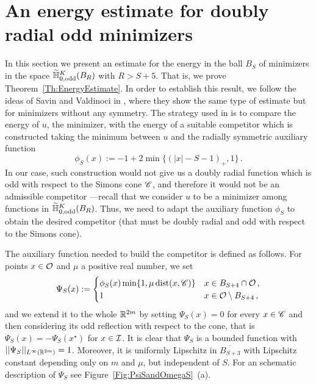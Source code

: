 \section{An energy estimate for doubly radial odd minimizers}
\label{Sec:EnergyEstimate}

In this section we present an estimate for the energy in the ball $B_S$ of minimizers in the space $\widetilde{\mathbb{H}}^K_{0, \mathrm{odd}}(B_R)$ with $R > S+ 5$. That is, we prove Theorem~\ref{Th:EnergyEstimate}. In order to establish this result, we follow the ideas of Savin and Valdinoci in \cite{SavinValdinoci-EnergyEstimate}, where they show the same type of estimate but for minimizers without any symmetry. The strategy used in \cite{SavinValdinoci-EnergyEstimate} is to compare the energy of $u$, the minimizer, with the energy of a suitable competitor which is constructed taking the minimum between $u$ and the radially symmetric auxiliary function
\begin{equation}
	\label{Eq:DefPhiS}
	\phi_S (x) :=-1+2\min\{(|x|-S-1)_+,1\}\,.
\end{equation}
In our case, such construction would not give us a doubly radial function which is odd with respect to the Simons cone $\mathscr{C}$, and therefore it would not be an admissible competitor ---recall that we consider $u$ to be a minimizer among functions in $\widetilde{\mathbb{H}}^K_{0, \mathrm{odd}}(B_R)$. Thus, we need to adapt the auxiliary function $\phi_S$ to obtain the desired  competitor (that must be doubly radial and odd with respect to the Simons cone).

The auxiliary function needed to build the competitor is defined as follows. For points $x\in \mathcal{O}$ and $\mu$ a positive real number, we set
\begin{equation}
	\label{Eq:DefPsiS}
\Psi_S(x) := 
\begin{cases}
\phi_S (x) \min \{1,\mu\operatorname{dist}(x,\mathscr{C})\} &  x \in B_{S+4}\cap \mathcal{O}\,, \\
1 &  x \in \mathcal{O} \setminus B_{S+4}\,,
\end{cases}
\end{equation}
and we extend it to the whole $\mathbb{R}^{2m}$ by setting $\Psi_S (x)=0$ for every $x\in \mathscr{C}$ and then considering its odd reflection with respect to the cone, that is $\Psi_S(x) = -\Psi_S(x^\star)$ for $x\in \mathcal{I}$. It is clear that $\Psi_S$ is a bounded function with $||\Psi_S||_{L^\infty(\mathbb{R}^{2m})}=1$. Moreover, it is uniformly Lipschitz in $\overline{B_{S+3}}$ with Lipschitz constant depending only on $m$ and $\mu$, but independent of $S$. For an schematic description of $\Psi_S$ see Figure~\ref{Fig:PsiSandOmegaS}~(a).

